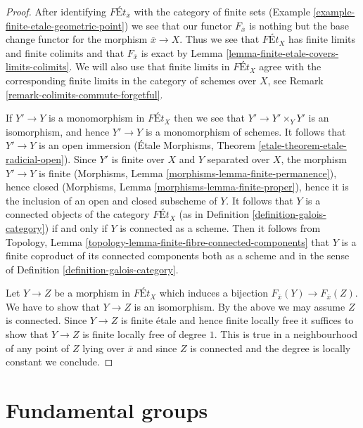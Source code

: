 \begin{proof}
After identifying $\textit{F\'Et}_{\overline{x}}$ with the category of
finite sets (Example \ref{example-finite-etale-geometric-point})
we see that our functor $F_{\overline{x}}$
is nothing but the base change functor for the morphism $\overline{x} \to X$.
Thus we see that $\textit{F\'Et}_X$ has finite limits and finite colimits
and that $F_{\overline{x}}$ is exact by
Lemma \ref{lemma-finite-etale-covers-limits-colimits}.
We will also use that finite limits in $\textit{F\'Et}_X$
agree with the corresponding finite limits in the category
of schemes over $X$, see Remark \ref{remark-colimits-commute-forgetful}.

\medskip\noindent
If $Y' \to Y$ is a monomorphism in $\textit{F\'Et}_X$
then we see that $Y' \to Y' \times_Y Y'$ is an isomorphism, and
hence $Y' \to Y$ is a monomorphism of schemes. It follows that
$Y' \to Y$ is an open immersion
(\'Etale Morphisms, Theorem \ref{etale-theorem-etale-radicial-open}). Since
$Y'$ is finite over $X$ and $Y$ separated over $X$,
the morphism $Y' \to Y$ is finite
(Morphisms, Lemma \ref{morphisms-lemma-finite-permanence}), hence closed
(Morphisms, Lemma \ref{morphisms-lemma-finite-proper}),
hence it is the inclusion of an open and closed subscheme of $Y$.
It follows that $Y$ is a connected objects of the category
$\textit{F\'Et}_X$ (as in Definition \ref{definition-galois-category})
if and only if $Y$ is connected as a scheme. Then it follows from
Topology, Lemma \ref{topology-lemma-finite-fibre-connected-components}
that $Y$ is a finite coproduct of its connected components
both as a scheme and in the sense of
Definition \ref{definition-galois-category}.

\medskip\noindent
Let $Y \to Z$ be a morphism in $\textit{F\'Et}_X$ which induces a
bijection $F_{\overline{x}}(Y) \to F_{\overline{x}}(Z)$. We have to
show that $Y \to Z$ is an isomorphism. By the above we may assume
$Z$ is connected. Since $Y \to Z$ is finite \'etale and hence finite
locally free it suffices to show that $Y \to Z$ is finite locally
free of degree $1$. This is true in a neighbourhood of any point of
$Z$ lying over $\overline{x}$ and since $Z$ is connected and
the degree is locally constant we conclude.
\end{proof}



\section{Fundamental groups}
\label{section-fundamental-groups}

